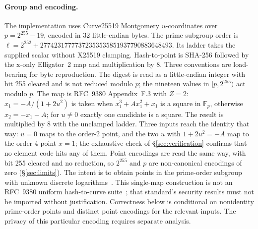 \documentclass[11pt]{article}
\begin{document}
\paragraph{Group and encoding.}
The implementation uses Curve25519 Montgomery $u$-coordinates over
$p=2^{255}-19$, encoded in 32 little-endian bytes. The prime subgroup order is
$\ell=2^{252}+27742317777372353535851937790883648493$. Its ladder takes the supplied scalar without X25519
clamping. Hash-to-point is SHA-256 followed by the x-only Elligator~2 map and
multiplication by 8. Three conventions are load-bearing for byte
reproduction. The digest is read as a little-endian integer with bit 255
cleared and is not reduced modulo $p$; the nineteen values in $[p,2^{255})$
act modulo $p$. The map is RFC~9380 Appendix~F.3 with $Z=2$:
$x_1=-A/(1+2u^2)$ is taken when $x_1^3+Ax_1^2+x_1$ is a square in
$\mathbb{F}_p$, otherwise $x_2=-x_1-A$; for $u\neq 0$ exactly one candidate
is a square. The result is multiplied by 8 with the unclamped ladder. Three
inputs reach the identity that way: $u=0$ maps to the order-2 point, and the
two $u$ with $1+2u^2=-A$ map to the order-4 point $x=1$; the exhaustive check
of \S\ref{sec:verification} confirms that no element code hits any of them.
Point encodings are read the same way, with bit 255 cleared and no reduction,
so $2^{255}$ and $p$ are non-canonical encodings of zero
(\S\ref{sec:limits}). The intent is to obtain
points in the prime-order subgroup with unknown discrete
logarithms~\cite{curve25519,elligator,rfc7748}.
This single-map construction is not an RFC~9380 uniform hash-to-curve
suite~\cite{rfc9380}; that standard's security results must not be imported
without justification. Correctness below is conditional on nonidentity
prime-order points and distinct point encodings for the relevant inputs.
The privacy of this particular encoding requires separate analysis.
\end{document}
